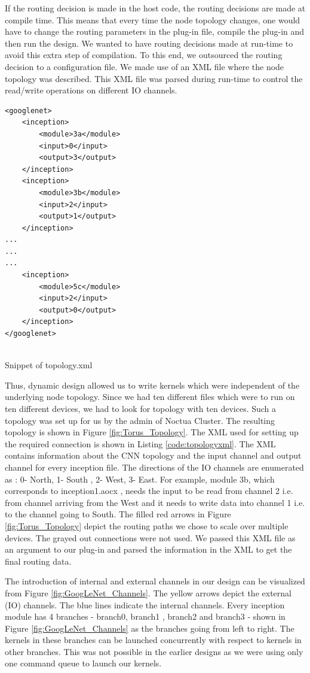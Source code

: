 If the routing decision is made in the host code, the routing decisions are made at compile time. This means that every time the node topology changes, one would have to change the routing parameters in the plug-in file, compile the plug-in and then run the design. We wanted to have routing decisions made at run-time to avoid this extra step of compilation. To this end, we outsourced the routing decision to a configuration file. We made use of an XML file where the node topology was described. This XML file was parsed during run-time to control the read/write operations on different IO channels. 

\begin{code}[!htb]
 \begin{verbatim}
<googlenet>
	<inception>
		<module>3a</module>           
		<input>0</input>				
		<output>3</output>
	</inception>
	<inception>
		<module>3b</module>
		<input>2</input>				
		<output>1</output>
	</inception>
...
...
...
	<inception>
		<module>5c</module>
		<input>2</input>				
		<output>0</output>
	</inception>
</googlenet>


\end{verbatim}
\caption{Snippet of topology.xml}
\label{code:topologyxml}
\end{code}
Thus, dynamic design allowed us to write kernels which were independent of the underlying node topology. Since we had ten different files which were to run on ten different devices, we had to look for topology with ten devices. Such a topology was set up for us by the admin of Noctua Cluster. The resulting topology is shown in Figure \ref{fig:Torus_Topology}. The XML used for setting up the required connection is shown in Listing \ref{code:topologyxml}. The XML contains information about the CNN topology and the input channel and output channel for every inception file. The directions of the IO channels are enumerated as : 0- North, 1- South , 2- West, 3- East. For example, module 3b, which corresponds to inception1.aocx , needs the input to be read from channel 2 i.e. from channel arriving from the West and it needs to write data into channel 1 i.e. to the channel going to South.  
The filled red arrows in Figure \ref{fig:Torus_Topology} depict the routing paths we chose to scale over multiple devices. The grayed out connections were not used. We passed this XML file as an argument to our plug-in and parsed the information in the XML to get the final routing data. 

The introduction of internal and external channels in our design can be visualized from Figure \ref{fig:GoogLeNet_Channels}. The yellow arrows depict the external (IO) channels. The blue lines indicate the internal channels. Every inception module has 4 branches - branch0, branch1 , branch2 and branch3 - shown in Figure \ref{fig:GoogLeNet_Channels} as the branches going from left to right. The kernels in these branches can be launched concurrently with respect to kernels in other branches.  This was not possible in the earlier designs as we were using only one command queue to launch our kernels.

